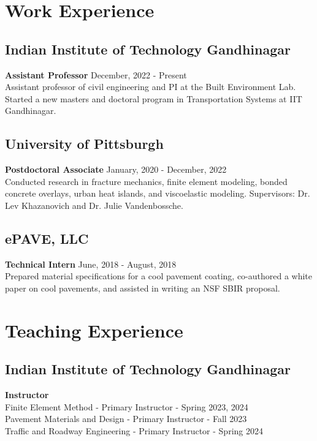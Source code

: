\documentclass[12pt]{article}
\begin{document}
\bigskip
\section*{Work Experience}
\hfill
\subsection*{Indian Institute of Technology Gandhinagar}
\textbf{Assistant Professor} \hfill December, 2022 - Present \\
Assistant professor of civil engineering and PI at the Built Environment Lab. Started a new masters and doctoral program in Transportation Systems at IIT Gandhinagar. \\

\subsection*{University of Pittsburgh}
\textbf{Postdoctoral Associate} \hfill January, 2020 - December, 2022 \\
Conducted research in fracture mechanics, finite element modeling, bonded concrete overlays, urban heat islands, and viscoelastic modeling. Supervisors: Dr. Lev Khazanovich and Dr. Julie Vandenbossche.\\

\subsection*{ePAVE, LLC}
\textbf{Technical Intern} \hfill June, 2018 - August, 2018 \\
Prepared material specifications for a cool pavement coating, co-authored a white paper on cool pavements, and assisted in writing an NSF SBIR proposal. 

\bigskip
\section*{Teaching Experience}
\hfill
\subsection*{Indian Institute of Technology Gandhinagar}
\textbf{Instructor}\\
Finite Element Method - Primary Instructor - Spring 2023, 2024 \\
Pavement Materials and Design - Primary Instructor - Fall 2023 \\
Traffic and Roadway Engineering - Primary Instructor - Spring 2024
\end{document}
